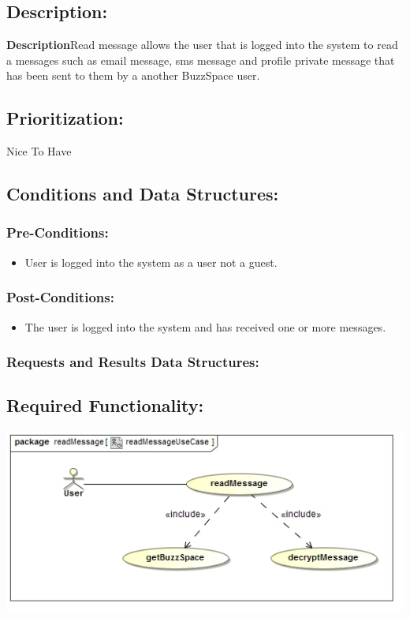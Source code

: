 \documentclass[a4paper,11pt]{article}
\begin{document}
\subsection*{Description:}
\textbf{Description}Read message allows the user that is logged into the system to read a messages such as email message, sms message and profile private message that has been sent to them by a another BuzzSpace user.
\subsection{Prioritization:} 
\textbf{}Nice To Have
\subsection{Conditions and Data Structures:}
\subsubsection*{Pre-Conditions:}
\begin{itemize}
\item User is logged into the system as a user not a guest. 
\end{itemize}
\subsubsection*{Post-Conditions:}
\begin{itemize}
\item The user is logged into the system and has received one or more messages.
\end{itemize}
\subsubsection*{Requests and Results Data Structures:}
\subsection{Required Functionality:} 
\includegraphics[width=1\linewidth]{./Images/PrivateMessage/readMessageUseCase}
\end{document}
